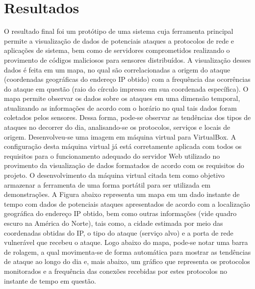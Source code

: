 \documentclass[%
        Portuguese,%
        ]
{ic-tese-v2}
\begin{document}
\chapter{Resultados}
O resultado final foi um protótipo de uma sistema cuja ferramenta principal permite a visualização de dados de potenciais ataques a protocolos de rede e aplicações de sistema, bem como de servidores comprometidos realizando o provimento de códigos maliciosos para sensores distribuídos. A visualização desses dados é feita em um mapa, no qual são correlacionadas a origem do ataque (coordenadas geográficas do endereço IP obtido) com a frequência das ocorrências do ataque em questão (raio do círculo impresso em sua coordenada específica).
O mapa permite observar os dados sobre os ataques em uma dimensão temporal, atualizando as informações de acordo com o horário no qual tais dados foram coletados pelos sensores. Dessa forma, pode-se observar as tendências dos tipos de ataques no decorrer do dia, analisando-se os protocolos, serviços e locais de origem.
Desenvolveu-se uma imagem em máquina virtual para VirtualBox. A configuração desta máquina virtual já está corretamente aplicada com todos os requisitos para o funcionamento adequado do servidor Web utilizado no provimento da visualização de dados formatados de acordo com os requisitos do projeto. O desenvolvimento da máquina virtual citada tem como objetivo armazenar a ferramenta de uma forma portátil para ser utilizada em demonstrações. A Figura abaixo representa um mapa em um dado instante de tempo com dados de potenciais ataques apresentados de acordo com a localização geográfica do endereço IP obtido, bem como outras informações (vide quadro escuro na América do Norte), tais como, a cidade estimada por meio das coordenadas obtidas do IP, o tipo do ataque (serviço alvo) e a porta de rede vulnerável que recebeu o ataque. Logo abaixo do mapa, pode-se notar uma barra de rolagem, a qual movimenta-se de forma automática para mostrar as tendências de ataque ao longo do dia e, mais abaixo, um gráfico que representa os protocolos monitorados e a frequência das conexões recebidas por estes protocolos no instante de tempo em questão.
\end{document}
